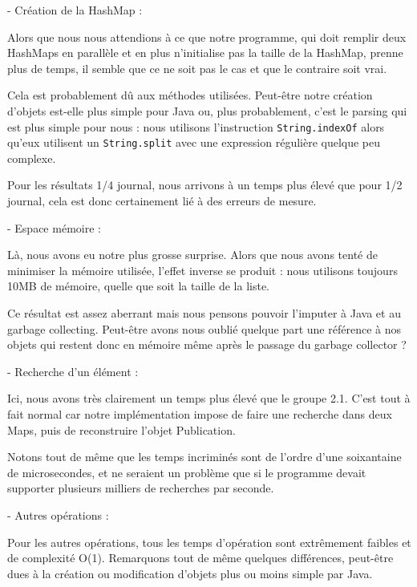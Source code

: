 \documentclass[a4paper,10pt]{article}
\begin{document}
	- Création de la HashMap :
	
	Alors que nous nous attendions à ce que notre programme, qui doit remplir deux HashMaps en parallèle et en plus n'initialise pas la taille de la HashMap, prenne plus de temps, il semble que ce ne soit pas le cas et que le contraire soit vrai.
	
	Cela est probablement dû aux méthodes utilisées. Peut-être notre création d'objets est-elle plus simple pour Java ou, plus probablement, c'est le parsing qui est plus simple pour nous : nous utilisons l'instruction \texttt{String.indexOf} alors qu'eux utilisent un \texttt{String.split} avec une expression régulière quelque peu complexe.
	
	Pour les résultats 1/4 journal, nous arrivons à un temps plus élevé que pour 1/2 journal, cela est donc certainement lié à des erreurs de mesure.
	
	\vspace{0.4cm}
	- Espace mémoire :
	
	Là, nous avons eu notre plus grosse surprise. Alors que nous avons tenté de minimiser la mémoire utilisée, l'effet inverse se produit : nous utilisons toujours 10MB de mémoire, quelle que soit la taille de la liste.
	
	Ce résultat est assez aberrant mais nous pensons pouvoir l'imputer à Java et au garbage collecting. Peut-être avons nous oublié quelque part une référence à nos objets qui restent donc en mémoire même après le passage du garbage collector ?
	
	\vspace{0.4cm}
	- Recherche d'un élément :
	
	Ici, nous avons très clairement un temps plus élevé que le groupe 2.1. C'est tout à fait normal car notre implémentation impose de faire une recherche dans deux Maps, puis de reconstruire l'objet Publication.
	
	Notons tout de même que les temps incriminés sont de l'ordre d'une soixantaine de microsecondes, et ne seraient un problème que si le programme devait supporter plusieurs milliers de recherches par seconde.

	\vspace{0.4cm}
	- Autres opérations :
	
	Pour les autres opérations, tous les temps d'opération sont extrêmement faibles et de complexité O(1). Remarquons tout de même quelques différences, peut-être dues à la création ou modification d'objets plus ou moins simple par Java.
\end{document}
